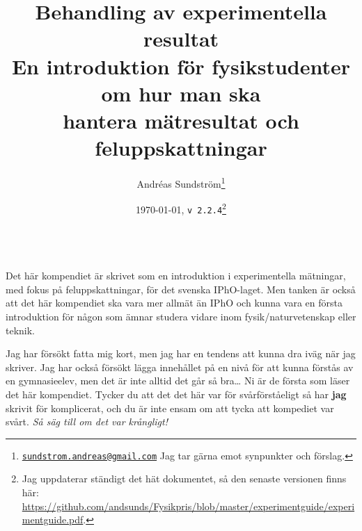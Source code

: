 \documentclass[11pt,a4paper, swedish
]{article}
\begin{document}
\title{\huge Behandling av experimentella resultat\\[2mm] 
\Large En introduktion för fysikstudenter om hur man ska\\ hantera
mätresultat och feluppskattningar}
\author{
Andréas Sundström\footnote{
\href{mailto:sundstrom.andreas@gmail.com}{\nolinkurl{sundstrom.andreas@gmail.com}}
\: Jag tar gärna emot synpunkter och förslag.}
}
\date{\today, \quad\texttt{v\,2.2.4}\footnote{Jag uppdaterar ständigt
    det hät dokumentet, så den senaste versionen finns här: \url{https://github.com/andsunds/Fysikpris/blob/master/experimentguide/experimentguide.pdf}.}}
\maketitle





\\[1mm]
\small
Det här kompendiet är skrivet som en introduktion i experimentella
mätningar, med fokus på feluppskattningar, för det svenska
IPhO-laget. Men tanken är också att det här kompendiet ska vara mer
allmät än IPhO och kunna vara en första introduktion för någon som
ämnar studera vidare inom fysik/naturvetenskap eller teknik. 

Jag har försökt fatta mig kort, men jag har en tendens att
kunna dra iväg när jag skriver. Jag har också försökt lägga innehållet
på en nivå för att kunna förstås av en gymnasieelev, men det är inte
alltid det går så bra\ldots{} Ni är de första som läser det här
kompendiet. Tycker du att det det här var för svårförståeligt så har
\textbf{jag} skrivit för komplicerat, och du är inte ensam om att
tycka att kompediet var svårt. \emph{Så säg till om det var krångligt!} 
\end{document}
